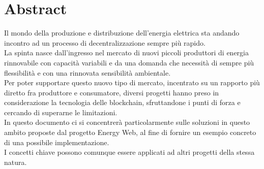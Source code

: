 \chapter*{Abstract}

Il mondo della produzione e distribuzione dell'energia elettrica sta andando incontro ad un processo di decentralizzazione sempre più rapido. \\
La spinta nasce dall'ingresso nel mercato di nuovi piccoli produttori di energia rinnovabile con capacità variabili e 
da una domanda che necessità di sempre più flessibilità e con una rinnovata sensibilità ambientale. \\
Per poter supportare questo nuovo tipo di mercato, incentrato su un rapporto più diretto fra produttore e consumatore, 
diversi progetti hanno preso in considerazione la tecnologia delle blockchain, sfruttandone i punti di forza e cercando di superarne le limitazioni. \\
In questo documento ci si concentrerà particolarmente sulle soluzioni in questo ambito proposte dal progetto Energy Web, 
al fine di fornire un esempio concreto di una possibile implementazione. \\
I concetti chiave possono comunque essere applicati ad altri progetti della stessa natura.